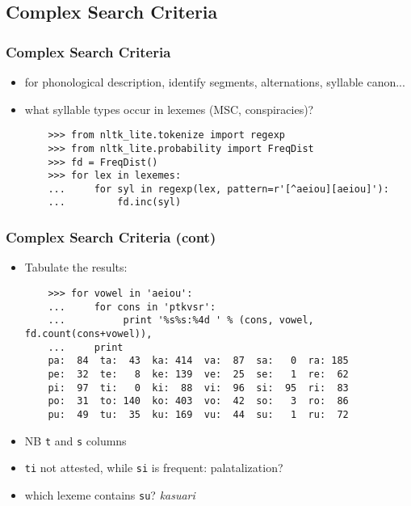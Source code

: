 \documentclass{beamer}
\begin{document}
\subsection{Complex Search Criteria}

\begin{frame}[fragile]
\frametitle{Complex Search Criteria}
\begin{itemize}
\item for phonological description, identify segments, alternations,
  syllable canon...
\item what syllable types occur in lexemes (MSC, conspiracies)?

\begin{verbatim}
    >>> from nltk_lite.tokenize import regexp
    >>> from nltk_lite.probability import FreqDist
    >>> fd = FreqDist()
    >>> for lex in lexemes:
    ...     for syl in regexp(lex, pattern=r'[^aeiou][aeiou]'):
    ...         fd.inc(syl)
\end{verbatim}
\end{itemize}
\end{frame}

\begin{frame}[fragile]
\frametitle{Complex Search Criteria (cont)}

\begin{itemize}
\item Tabulate the results:

\begin{verbatim}
    >>> for vowel in 'aeiou':
    ...     for cons in 'ptkvsr':
    ...          print '%s%s:%4d ' % (cons, vowel, fd.count(cons+vowel)),
    ...     print
    pa:  84  ta:  43  ka: 414  va:  87  sa:   0  ra: 185 
    pe:  32  te:   8  ke: 139  ve:  25  se:   1  re:  62 
    pi:  97  ti:   0  ki:  88  vi:  96  si:  95  ri:  83 
    po:  31  to: 140  ko: 403  vo:  42  so:   3  ro:  86 
    pu:  49  tu:  35  ku: 169  vu:  44  su:   1  ru:  72 
\end{verbatim}
\item NB \texttt{t} and \texttt{s} columns
\item \texttt{ti} not attested, while \texttt{si} is frequent: palatalization?
\item which lexeme contains \texttt{su}?  \textit{kasuari}
\end{itemize}
\end{frame}
\end{document}

